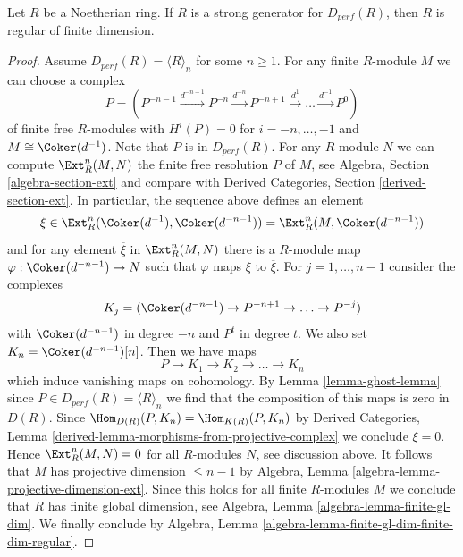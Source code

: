 \begin{lemma}
\label{lemma-not-regular-not-strong}
Let $R$ be a Noetherian ring. If $R$ is
a strong generator for $D_{perf}(R)$, then $R$ is regular
of finite dimension.
\end{lemma}

\begin{proof}
Assume $D_{perf}(R) = \langle R \rangle_n$ for some $n \geq 1$.
For any finite $R$-module $M$ we can choose a complex
$$
P = (
P^{-n - 1} \xrightarrow{d^{-n - 1}}
P^{-n} \xrightarrow{d^{-n}}
P^{-n + 1} \xrightarrow{d^1}
\ldots \xrightarrow{d^{-1}} P^0)
$$
of finite free $R$-modules with $H^i(P) = 0$ for $i = -n, \ldots, - 1$
and $M \cong \Coker(d^{-1})$. Note that $P$ is in $D_{perf}(R)$.
For any $R$-module $N$ we can compute $\Ext^n_R(M, N)$
the finite free resolution $P$ of $M$, see
Algebra, Section \ref{algebra-section-ext} and compare with
Derived Categories, Section \ref{derived-section-ext}.
In particular, the sequence above defines an element
$$
\xi \in \Ext^n_R(\Coker(d^{-1}), \Coker(d^{-n - 1})) =
\Ext^n_R(M, \Coker(d^{-n - 1}))
$$
and for any element $\overline{\xi}$ in $\Ext^n_R(M, N)$
there is a $R$-module map $\varphi : \Coker(d^{-n - 1}) \to N$ such
that $\varphi$ maps $\xi$ to $\overline{\xi}$.
For $j = 1, \ldots, n - 1$ consider the complexes
$$
K_j = (\Coker(d^{-n - 1}) \to P^{-n + 1} \to \ldots \to P^{-j})
$$
with $\Coker(d^{-n - 1})$ in degree $-n$ and $P^t$ in degree $t$.
We also set $K_n = \Coker(d^{-n - 1})[n]$. Then we have maps
$$
P \to K_1 \to K_2 \to \ldots \to K_n
$$
which induce vanishing maps on cohomology. By Lemma \ref{lemma-ghost-lemma}
since $P \in D_{perf}(R) = \langle R \rangle_n$ we find that the composition
of this maps is zero in $D(R)$. Since
$\Hom_{D(R)}(P, K_n) = \Hom_{K(R)}(P, K_n)$ by
Derived Categories, Lemma \ref{derived-lemma-morphisms-from-projective-complex}
we conclude $\xi = 0$. Hence $\Ext^n_R(M, N) = 0$ for all $R$-modules
$N$, see discussion above.
It follows that $M$ has projective dimension $\leq n - 1$ by
Algebra, Lemma \ref{algebra-lemma-projective-dimension-ext}.
Since this holds for all finite $R$-modules $M$ we conclude that
$R$ has finite global dimension, see
Algebra, Lemma \ref{algebra-lemma-finite-gl-dim}.
We finally conclude by Algebra, Lemma
\ref{algebra-lemma-finite-gl-dim-finite-dim-regular}.
\end{proof}